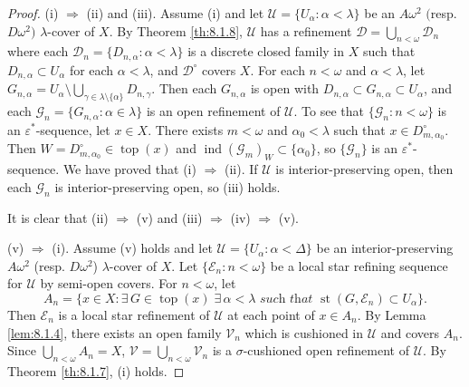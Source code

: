 \documentclass[main.tex]{subfiles}
\begin{document}
\begin{proof} 
(i) $\Rightarrow$ (ii) and (iii). Assume (i) and let $\mathscr{U}= \{U_\alpha: \alpha < \lambda\}$ 
be an $A\omega^2$ $($resp. $D\omega^2)$  $\lambda$-cover of $X$. 
By Theorem \ref{th:8.1.8}, $\mathscr{U}$ has a refinement 
$\mathscr{D} = \bigcup_{n<\omega} \mathscr{D}_n$ where each 
$\mathscr{D}_n= \{D_{n,\alpha}: \alpha<\lambda\}$ is a discrete closed family in $X$ 
such that  $D_{n,\alpha}\subset U_\alpha$ for each $\alpha< \lambda$, 
and $\mathscr{D}^\circ$ covers $X$.
For each $n<\omega$ and $\alpha<\lambda$, let 
$G_{n,\alpha} = U_\alpha \setminus \bigcup_{\gamma \in\lambda\setminus\{\alpha\}} D_{n,\gamma}$. 
Then each $G_{n,\alpha}$ is open with 
$D_{n,\alpha} \subset G_{n,\alpha} \subset U_\alpha$, and 
each $\mathscr{G}_n = \{G_{n,\alpha} : \alpha \in \lambda\}$ is an open 
refinement of $\mathscr{U}$. To see that $\{\mathscr{G}_n:n< \omega\}$ 
is an $\varepsilon^*$-sequence, let $x \in X$. There exists $m < \omega$ 
and $\alpha_0< \lambda$ such that $x \in D_{m,\alpha_0}^\circ$. Then
$W=D_{m,\alpha_0}^\circ\in \operatorname{top}(x)$ and 
$\operatorname{ind}(\mathscr{G}_m)_W\subset \{\alpha_0\}$, so
$\{\mathscr{G}_n\}$ is an $\varepsilon^*$-sequence. We have proved that (i)
$\Rightarrow$ (ii).
If $\mathscr{U}$ is interior-preserving open, then each $\mathscr{G}_n$
is interior-preserving open, so (iii) holds.

It is clear that (ii) $\Rightarrow$ (v) and (iii) $\Rightarrow$ (iv) 
$\Rightarrow$ (v).

(v) $\Rightarrow$ (i). Assume (v) holds and let 
$\mathscr{U} = \{U_\alpha: \alpha < \Delta\}$ be an interior-preserving
$A\omega^2$ (resp. $D\omega^2$)  $\lambda$-cover  of $X$. 
Let $\{\mathscr{E}_n: n < \omega\}$ be a local star refining sequence for 
$\mathscr{U}$ by semi-open covers. For $n < \omega$, let
$$A_n = \{x \in X: \exists \, G\in \operatorname{top}(x)\; \exists \, \alpha<\lambda
  \textit{ such that } \operatorname{st}(G, \mathscr{E}_n)\subset U_\alpha\}.$$
Then $\mathscr{E}_n$ is a local star refinement of $\mathscr{U}$ at each point of 
$x\in A_n$. By Lemma \ref{lem:8.1.4}, there exists an open family $\mathscr{V}_n$ 
which is cushioned in $\mathscr{U}$ and covers $A_n$.
Since $\bigcup_{n < \omega} A_n = X$, 
$\mathscr{V} = \bigcup_{n < \omega}\mathscr{V}_n$ 
is a $\sigma$-cushioned open refinement of $\mathscr{U}$. 
By Theorem \ref{th:8.1.7}, (i) holds.
\end{proof}





%
\end{document}
